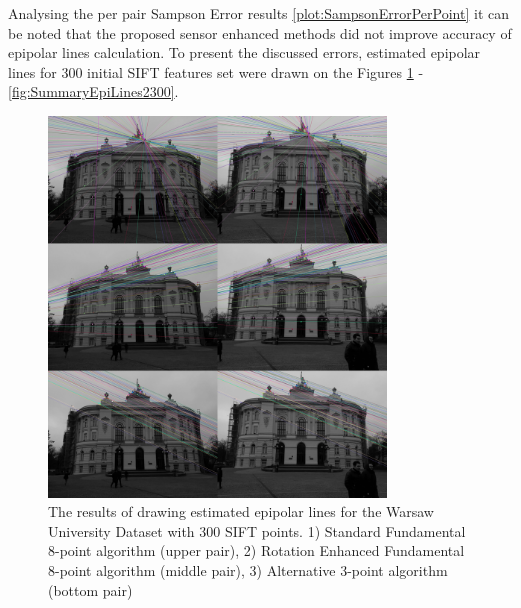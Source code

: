 Analysing the per pair Sampson Error results \ref{plot:SampsonErrorPerPoint} it can be noted that the proposed sensor enhanced methods did not improve accuracy of epipolar lines calculation. To present the discussed errors, estimated epipolar lines for 300 initial SIFT features set were drawn on the Figures \ref{fig:SummaryEpiLines1300} - \ref{fig:SummaryEpiLines2300}.
\begin{figure}[b!]
    \centering
    \includegraphics[width=0.8\textwidth]{summary1Sift300}
    \caption[The results of drawing estimated epipolar lines for the Warsaw University Dataset with 300 SIFT points (1st group)]{The results of drawing estimated epipolar lines for the Warsaw University Dataset with 300 SIFT points. 1) Standard Fundamental 8-point algorithm (upper pair), 2) Rotation Enhanced Fundamental 8-point algorithm (middle pair), 3) Alternative 3-point algorithm (bottom pair) }
    \label{fig:SummaryEpiLines1300}
\end{figure}
